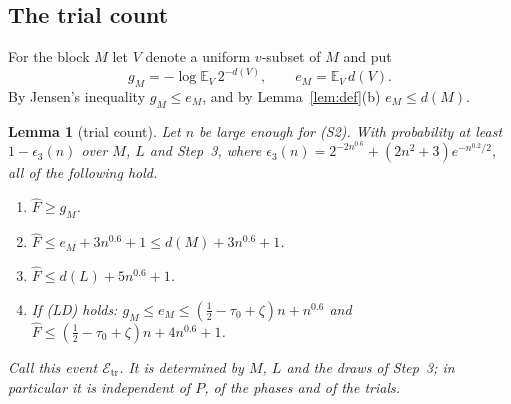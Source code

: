 \documentclass[11pt]{article}
\newtheorem{lemma}{Lemma}[section]
\theoremstyle{definition}
\newcommand{\E}{\mathbb E}
\newcommand{\cE}{\mathcal E}
\begin{document}
\subsection{The trial count}
For the block $M$ let $V$ denote a uniform $v$-subset of $M$ and put
\[
 g_M=-\log\E_V\,2^{-d(V)},\qquad e_M=\E_V\,d(V).
\]
By Jensen's inequality $g_M\le e_M$, and by Lemma~\ref{lem:def}(b) $e_M\le d(M)$.

\begin{lemma}[trial count]\label{lem:A3}
Let $n$ be large enough for \textup{(S2)}. With probability at least $1-\epsilon_3(n)$ over $M$, $L$ and Step~3,
where $\epsilon_3(n)=2^{-2n^{0.6}}+(2n^2+3)e^{-n^{0.2}/2}$, all of the following hold.
\begin{enumerate}[label=\textup{(\roman*)}]
\item $\hat F\ge g_M$.
\item $\hat F\le e_M+3n^{0.6}+1\le d(M)+3n^{0.6}+1$.
\item $\hat F\le d(L)+5n^{0.6}+1$.
\item If \textup{(LD)} holds: $g_M\le e_M\le(\tfrac12-\tau_0+\zeta)n+n^{0.6}$ and
$\hat F\le(\tfrac12-\tau_0+\zeta)n+4n^{0.6}+1$.
\end{enumerate}
Call this event $\cE_{\mathrm{tr}}$. It is determined by $M$, $L$ and the draws of Step~3; in particular it is
independent of $P$, of the phases and of the trials.
\end{lemma}
\end{document}
